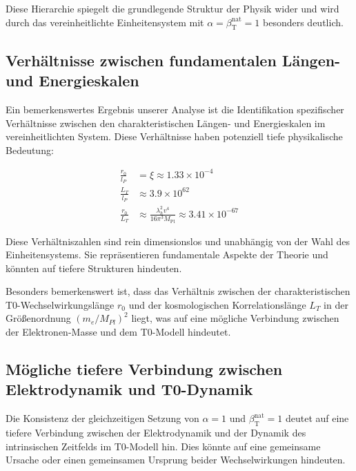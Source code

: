 \documentclass[12pt,a4paper]{article}
\newcommand{\betaT}{\beta_{\text{T}}}
\newcommand{\Mpl}{M_{\text{Pl}}}
\begin{document}
	Diese Hierarchie spiegelt die grundlegende Struktur der Physik wider und wird durch das vereinheitlichte Einheitensystem mit \(\alpha = \betaT^{\text{nat}} = 1\) besonders deutlich.
	
	\subsection{Verhältnisse zwischen fundamentalen Längen- und Energieskalen}
	
	Ein bemerkenswertes Ergebnis unserer Analyse ist die Identifikation spezifischer Verhältnisse zwischen den charakteristischen Längen- und Energieskalen im vereinheitlichten System. Diese Verhältnisse haben potenziell tiefe physikalische Bedeutung:
	
	\begin{tcolorbox}[colback=blue!5!white,colframe=blue!75!black,title=Fundamentale Verhältnisse im vereinheitlichten Einheitensystem]
		\begin{align}
			\frac{r_0}{l_P} &= \xi \approx 1.33 \times 10^{-4} \\
			\frac{L_T}{l_P} &\approx 3.9 \times 10^{62} \\
			\frac{r_0}{L_T} &\approx \frac{\lambda_h^2 v^4}{16\pi^3 \Mpl} \approx 3.41 \times 10^{-67}
		\end{align}
	\end{tcolorbox}
	
	Diese Verhältniszahlen sind rein dimensionslos und unabhängig von der Wahl des Einheitensystems. Sie repräsentieren fundamentale Aspekte der Theorie und könnten auf tiefere Strukturen hindeuten.
	
	Besonders bemerkenswert ist, dass das Verhältnis zwischen der charakteristischen\\ T0-Wechselwirkungslänge \(r_0\) und der kosmologischen Korrelationslänge \(L_T\) in der Größenordnung \((m_e/M_{Pl})^2\) liegt, was auf eine mögliche Verbindung zwischen der Elektronen-Masse und dem T0-Modell hindeutet.
	
	\subsection{Mögliche tiefere Verbindung zwischen Elektrodynamik und T0-Dynamik}
	
	Die Konsistenz der gleichzeitigen Setzung von \(\alpha = 1\) und \(\betaT^{\text{nat}} = 1\) deutet auf eine tiefere Verbindung zwischen der Elektrodynamik und der Dynamik des intrinsischen Zeitfelds im T0-Modell hin. Dies könnte auf eine gemeinsame Ursache oder einen gemeinsamen Ursprung beider Wechselwirkungen hindeuten.
	
\end{document}
